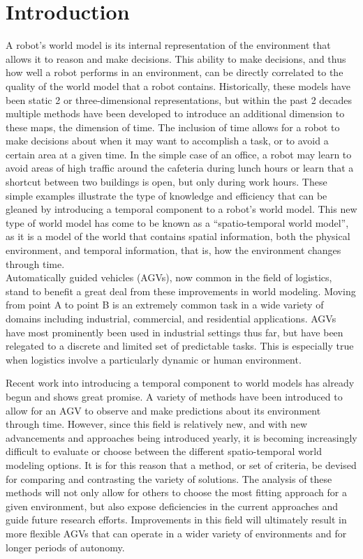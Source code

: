 

  \chapter{ Introduction }

  A robot's world model is its internal representation of the environment that
  allows it to reason and make decisions. This ability to make decisions, and
  thus how well a robot performs in an environment, can be directly correlated
  to the quality of the world model that a robot contains. Historically, these models
  have been static 2 or three-dimensional representations, but within the past
  2 decades multiple methods have been developed to introduce an additional
  dimension to these maps, the dimension of time. The inclusion of time allows
  for a robot to make decisions about when it may want to accomplish a task, or
  to avoid a certain area at a given time. In the simple case of an
  office, a robot may learn to avoid areas of high traffic around the cafeteria
  during lunch hours or learn that a shortcut between two buildings is open, but only
  during work hours. These simple examples illustrate the type of knowledge and
  efficiency that can be gleaned by introducing a temporal component to a robot's
  world model. This new type of world model has come to be known as a
  ``spatio-temporal world model'', as it is a model of the world that contains
  spatial information, both the physical environment, and temporal
  information, that is, how the environment changes through time.\\

  Automatically guided vehicles (AGVs), now common in the field of logistics,
  stand to benefit a great deal from these improvements in world modeling.
  Moving from point A to point B is an extremely common task in a wide
  variety of domains including industrial, commercial, and residential
  applications. AGVs have most prominently been used in industrial settings thus
  far, but have been relegated to a discrete and limited set
  of predictable tasks. This is especially true when logistics involve a
  particularly dynamic or human environment.

  Recent work into introducing a temporal component to world models has
  already begun and shows great promise. A variety of methods have been
  introduced to allow for an AGV to observe and make predictions about its
  environment through time. However, since this field is relatively new, and
  with new advancements and approaches being introduced yearly, it is becoming
  increasingly difficult to evaluate or choose between the
  different spatio-temporal world modeling options. It is for this reason that a
  method, or set of criteria, be devised for comparing and contrasting the
  variety of solutions. The analysis of these methods will not only allow for
  others to choose the most fitting approach for a given environment, but also
  expose deficiencies in the current approaches and guide future research
  efforts. Improvements in this field will ultimately result in more flexible
  AGVs that can operate in a wider variety of environments and for longer
  periods of autonomy.

